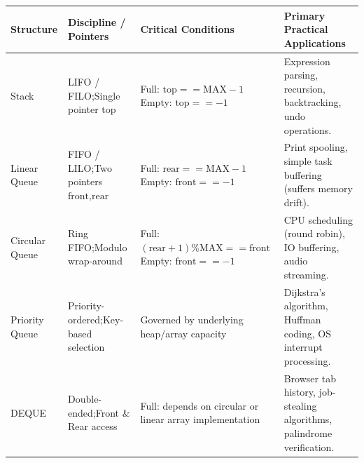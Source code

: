 \documentclass[12pt,a4paper]{article}
\renewcommand{\arraystretch}{1.45}
\begin{document}
\begin{tcolorbox}[tikzbox, title={\textbf{Summary Matrix: Comprehensive Comparison of Stack and Queue Structures}}]
\par\vspace{2pt}\noindent
\begingroup
\footnotesize
\setlength{\tabcolsep}{3.5pt}
\setlength{\extrarowheight}{1.5pt}
\renewcommand{\arraystretch}{1.15}
\begin{tabularx}{\linewidth}{|B{2.2cm}|B{3.2cm}|B{3.2cm}|Y|}
\hline
\textbf{Structure} & \textbf{Discipline / Pointers} & \textbf{Critical Conditions} & \textbf{Primary Practical Applications} \\
\hline
Stack & LIFO / FILO;\newline Single pointer $\text{top}$ & Full: $\text{top} == \text{MAX}-1$\newline Empty: $\text{top} == -1$ & Expression parsing, recursion, backtracking, undo operations. \\
\hline
Linear Queue & FIFO / LILO;\newline Two pointers $\text{front}, \text{rear}$ & Full: $\text{rear} == \text{MAX}-1$\newline Empty: $\text{front} == -1$ & Print spooling, simple task buffering (suffers memory drift). \\
\hline
Circular Queue & Ring FIFO;\newline Modulo wrap-around & Full: $(\text{rear}+1)\%\text{MAX} == \text{front}$\newline Empty: $\text{front} == -1$ & CPU scheduling (round robin), IO buffering, audio streaming. \\
\hline
Priority Queue & Priority-ordered;\newline Key-based selection & Governed by underlying heap/array capacity & Dijkstra's algorithm, Huffman coding, OS interrupt processing. \\
\hline
DEQUE & Double-ended;\newline Front \& Rear access & Full: depends on circular or linear array implementation & Browser tab history, job-stealing algorithms, palindrome verification. \\
\hline
\end{tabularx}
\endgroup
\end{tcolorbox}
\end{document}

